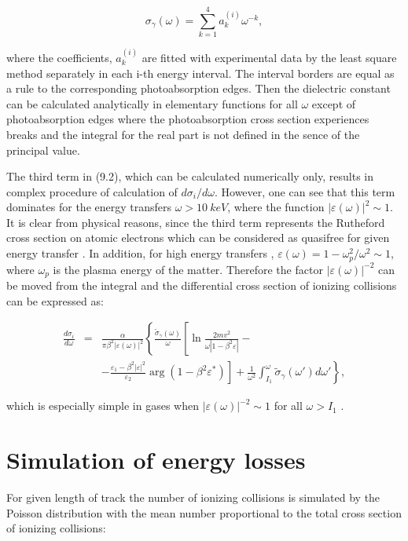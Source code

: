 \[
\sigma_{\gamma}(\omega) = \sum_{k=1}^{4}a_{k}^{(i)}\omega^{-k} ,
\]

where the coefficients, $a_{k}^{(i)}$ are fitted with experimental data by the
least square method separately in each i-th energy interval. The interval borders
are equal as a rule to the corresponding photoabsorption edges. Then the dielectric
constant can be calculated analytically in elementary functions for all $\omega$
except of photoabsorption edges where the photoabsorption cross section 
experiences breaks and the integral for the real part is not defined in the 
sence of the principal value.

The third term in (9.2), which can be calculated numerically only, results in
complex procedure of calculation of $d\sigma_i/d\omega$. However, one can see
that this term dominates for the energy transfers $\omega > 10\ keV$, where the
function $\left|\varepsilon(\omega)\right|^2 \sim 1$. It is clear from physical
reasons, since the third term represents the Rutheford cross section on atomic
electrons which can be considered as quasifree for given energy transfer \cite
{allis}. In addition, for high energy transfers , 
$\varepsilon(\omega) = 1 - \omega_{p}^{2}/\omega^2 \sim 1$, where $\omega_{p}$ is
the plasma energy of the matter. Therefore the factor
$\left|\varepsilon(\omega)\right|^{-2}$ can be moved from the integral and the 
differential cross section of ionizing collisions can be expressed as:

\begin{eqnarray}
\frac{d\sigma_i}{d\omega}
& = &\frac{\alpha}
{\pi\beta^2\left|\varepsilon(\omega)\right|^2}
\left\{
\frac{\tilde{\sigma}_{\gamma}(\omega)}{\omega}
\left[
\ln\frac{2mv^2}{\omega\left|1-\beta^2\varepsilon\right|} - 
\right. \right. \nonumber \\ 
&   & \left. \left.
- \frac{\varepsilon_1-\beta^2\left|\varepsilon\right|^2}{\varepsilon_2}
\arg(1-\beta^2\varepsilon^*)
\right]
 + \frac{1}{\omega^2}\int_{I_1}^{\omega}\tilde{\sigma}_{\gamma}(\omega')d\omega'
\right\} ,
\end{eqnarray}

which is especially simple in gases when 
$\left|\varepsilon(\omega)\right|^{-2} \sim 1$  for all $\omega > I_1$
\cite{allis}.

\section{Simulation of energy losses}

For given length of track the number of ionizing collisions is simulated by
the Poisson distribution with the mean number proportional to the total cross
section of ionizing collisions:

